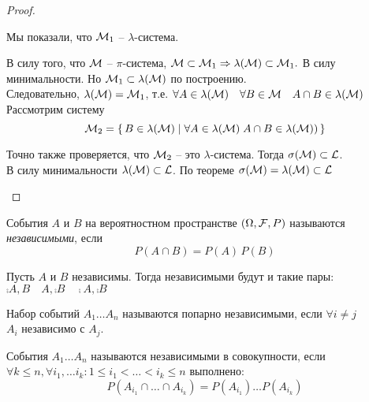 \begin{proof}
\begin{enumerate}
			Мы показали, что $\mathcal{M}_1$ -- $\lambda$-система.

			В силу того, что $\mathcal{M}$ -- $\pi$-система, $\mathcal{M} \subset \mathcal{M}_1 
			\Rightarrow \lambda(\mathcal{M}) \subset \mathcal{M}_1.$ 
			В силу минимальности. Но $\mathcal{M}_1 \subset \lambda(\mathcal{M})$ по построению. \\
			Следовательно, $\lambda(\mathcal{M}) = \mathcal{M}_1$, т.е. 
			$\forall A \in \lambda(\mathcal{M}) \quad \forall B \in \mathcal{M} \quad A \cap B \in \lambda(\mathcal{M})$\\
			
			Рассмотрим систему
			\begin{equation*}
				\mathcal{M}_2 = \left\{ \, B \in \lambda(\mathcal{M}) \mid \forall A \in \lambda(\mathcal{M}) \; A \cap B \in \lambda(\mathcal{M})) \, \right\}
			\end{equation*}

			Точно также проверяется, что $\mathcal{M}_2$ -- это $\lambda$-система.
			Тогда $\sigma(\mathcal{M}) \subset \mathcal{L}$.\\
			В силу минимальности $\lambda(\mathcal{M}) \subset \mathcal{L}$. 
			По теореме $\sigma(\mathcal{M}) = \lambda(\mathcal{M}) \subset \mathcal{L}$
	\end{enumerate}
\end{proof}


\begin{definition}
	События $A$ и $B$ на вероятностном пространстве $(\Omega, \mathcal{F}, P)$ 
	называются \emph{независимыми}, если
	\begin{equation*}
		P(A \cap B) = P(A) \, P(B)
	\end{equation*}
\end{definition}

\begin{exercise}
	Пусть $A$ и $B$ независимы. Тогда независимыми будут и такие пары:\\
	$\comp{A}, B \quad A, \comp{B} \quad \comp{A}, \comp{B}$
\end{exercise}
 
\begin{definition}
	Набор событий $A_1 \ldots A_n$ называются попарно независимыми, если $\forall i \neq j$ \\
	$A_i$ независимо с $A_j$.
\end{definition}

\begin{definition}
	События $A_1 \ldots A_n$ называются независимыми в совокупности, если $\forall k \leq n, 
	\forall i_1, \ldots i_k : 1 \leq i_1 < \ldots < i_k \leq n$ выполнено:
	\begin{equation*}
		P(A_{i_1} \cap \ldots \cap A_{i_k}) = P(A_{i_1}) \ldots P(A_{i_k})
	\end{equation*}
\end{definition}

